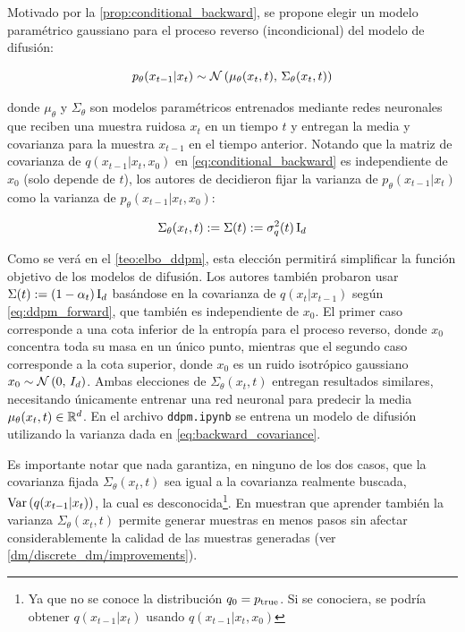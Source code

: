 Motivado por la \autoref{prop:conditional_backward}, se propone elegir un modelo paramétrico gaussiano para el proceso reverso (incondicional) del modelo de difusión:

\begin{equation}
    \label{eq:backward_transition}
    p_\theta(x_{t-1}|x_t)\sim\mathcal{N}\left(\mu_\theta(x_t,t),\,\Sigma_\theta(x_t,t)\right)
\end{equation}

donde $\mu_\theta$ y $\Sigma_\theta$ son modelos paramétricos entrenados mediante redes neuronales que reciben una muestra ruidosa $x_t$ en un tiempo $t$ y entregan la media y covarianza para la muestra $x_{t-1}$ en el tiempo anterior. Notando que la matriz de covarianza de $q(x_{t-1}|x_t,x_0)$ en \eqref{eq:conditional_backward} es independiente de $x_0$ (solo depende de $t$), los autores de \cite{ho2020denoising} decidieron fijar la varianza de $p_\theta(x_{t-1}|x_t)$ como la varianza de $p_\theta(x_{t-1}|x_t,x_0)$:

\begin{equation}
    \label{eq:backward_covariance}
    \Sigma_\theta(x_t,t):=\Sigma(t):=\sigma_q^2(t)\operatorname{I}_{d}
\end{equation}

Como se verá en el \autoref{teo:elbo_ddpm}, esta elección permitirá simplificar la función objetivo de los modelos de difusión. Los autores también probaron usar $\Sigma(t):=(1-\alpha_{t})\operatorname{I}_{d}$ basándose en la covarianza de $q(x_{t}|x_{t-1})$ según \eqref{eq:ddpm_forward}, que también es independiente de $x_0$. El primer caso corresponde a una cota inferior de la entropía para el proceso reverso, donde $x_0$ concentra toda su masa en un único punto, mientras que el segundo caso corresponde a la cota superior, donde $x_0$ es un ruido isotrópico gaussiano $x_0\sim\mathcal{N}\left(0,\,I_d\right)$. Ambas elecciones de $\Sigma_\theta(x_t,t)$ entregan resultados similares, necesitando únicamente entrenar una red neuronal para predecir la media $\mu_\theta(x_t,t)\in\mathbb{R}^d$. En el archivo \texttt{ddpm.ipynb} se entrena un modelo de difusión utilizando la varianza dada en \eqref{eq:backward_covariance}.

Es importante notar que nada garantiza, en ninguno de los dos casos, que la covarianza fijada $\Sigma_\theta(x_t,t)$ sea igual a la covarianza realmente buscada, $\operatorname{Var}\left(q(x_{t-1}|x_t)\right)$, la cual es desconocida\footnote{Ya que no se conoce la distribución $q_0=p_{\operatorname{true}}$. Si se conociera, se podría obtener $q(x_{t-1}|x_t)$ usando $q(x_{t-1}|x_t,x_0)$}. En \cite{nichol2021improved} muestran que aprender también la varianza $\Sigma_\theta(x_t,t)$ permite generar muestras en menos pasos sin afectar considerablemente la calidad de las muestras generadas (ver \autoref{dm/discrete_dm/improvements}).

